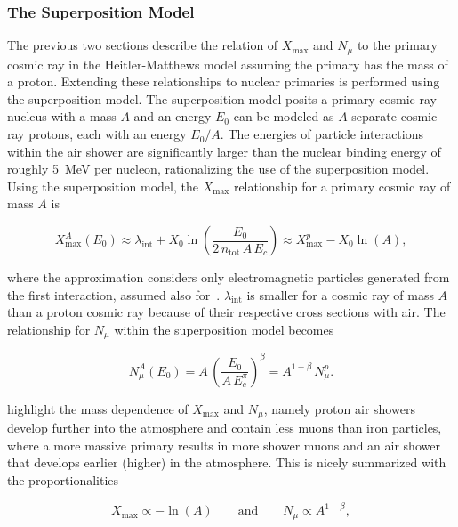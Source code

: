 \subsubsection{The Superposition Model}\label{sssec:superposition}
The previous two sections describe the relation of $X_{\text{max}}$ and $N_{\mu}$ to the primary cosmic ray in the Heitler-Matthews model assuming the primary has the mass of a proton.
Extending these relationships to nuclear primaries is performed using the superposition model. 
The superposition model posits a primary cosmic-ray nucleus with a mass $A$ and an energy $E_{0}$ can be modeled as $A$ separate cosmic-ray protons, each with an energy $E_{0} / A$.
The energies of particle interactions within the air shower are significantly larger than the nuclear binding energy of roughly \qty{5}{\mega\electronvolt} per nucleon, rationalizing the use of the superposition model.
Using the superposition model, the $X_{\text{max}}$ relationship for a primary cosmic ray of mass $A$ is

\begin{equation}
    X_{\text{max}}^{A}\left( E_{0} \right) \approx \lambda_{\text{int}} + X_{0} \ln\left( \frac{E_{0}}{2\,n_{\text{tot}}\,A\,E_{c}} \right) \approx X_{\text{max}}^{p} - X_{0}\ln\left(A\right), \label{eq:nucleon_xmax}
\end{equation}

\noindent
where the approximation considers only electromagnetic particles generated from the first interaction, assumed also for~.
$\lambda_{\text{int}}$ is smaller for a cosmic ray of mass $A$ than a proton cosmic ray because of their respective cross sections with air.
The relationship for $N_{\mu}$ within the superposition model becomes

\begin{equation}
    N_{\mu}^{A}\left( E_{0} \right) = A\,\left( \frac{E_{0}}{A\,E_{c}^{\pi}} \right)^{\beta} = A^{1-\beta}\,N_{\mu}^{p}. \label{eq:nucleon_nmu}
\end{equation}

 highlight the mass dependence of $X_{\text{max}}$ and $N_{\mu}$, namely proton air showers develop further into the atmosphere and contain less muons than iron particles, where a more massive primary results in more shower muons and an air shower that develops earlier (higher) in the atmosphere.
This is nicely summarized with the proportionalities

\begin{equation}
    X_{\text{max}} \propto -\ln\left( A \right) \qquad \text{and} \qquad N_{\mu} \propto A^{1-\beta}, \label{eq:observables_mass}
\end{equation}

